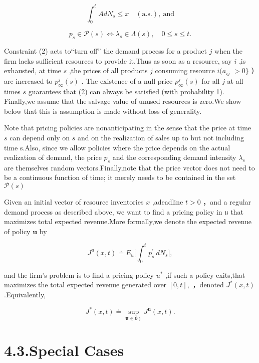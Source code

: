 \[
\int _ { 0 } ^ { t } A d N _ { s } \leqslant x \quad \mathrm { ( a . s . ) , ~ a n d }
\]

\[
p _ { s } \in \mathcal { P } ( s ) \Leftrightarrow \lambda _ { s } \in \Lambda ( s ) , \quad 0 \leqslant s \leqslant t .
\]

Constraint (2) acts to``turn off'' the demand process for a product
\(j\) when the firm lacks sufficient resources to provide it.Thus as
soon as a resource, say \(i\) ,is exhausted, at time \(s\) ,the prices
of all products \(j\) consuming resource \(i ( a _ { i j }\) \(> 0 \}\)
）are increased to \(p _ { \infty } ^ { j } ( s )\) . The existence of a
null price \(p _ { \infty } ^ { j } ( s )\) for all \(j\) at all times
\(s\) guarantees that (2) can always be satisfied (with probability 1).
Finally,we assume that the salvage value of unused resources is zero.We
show below that this is assumption is made without loss of generality.

Note that pricing policies are nonanticipating in the sense that the
price at time \(s\) can depend only on \(s\) and on the realization of
sales up to but not including time s.Also, since we allow policies where
the price depends on the actual realization of demand, the price
\(p _ { s }\) and the corresponding demand intensity \(\lambda _ { s }\)
are themselves random vectors.Finally,note that the price vector does
not need to be a continuous function of time; it merely needs to be
contained in the set \(\mathcal { P } ( s )\)

Given an initial vector of resource inventories \(x\) ,adeadline
\(t > 0\) ，and a regular demand process as described above, we want to
find a pricing policy in \(\mathfrak { u }\) that maximizes total
expected revenue.More formally,we denote the expected revenue of policy
\(\boldsymbol { u }\) by

\[
J ^ { u } ( x , t ) \doteq E _ { u } \biggl [ \int _ { 0 } ^ { t } p _ { s } ^ { \prime } \ d N _ { s } \biggl ] ,
\]

and the firm's problem is to find a pricing policy \(u ^ { * }\) ,if
such a policy exits,that maximizes the total expected revenue generated
over \([ 0 , t ] ,\) ，denoted \(J ^ { * } ( x , t )\) .Equivalently,

\[
J ^ { * } ( x , t ) \doteq \operatorname* { s u p } _ { \boldsymbol { \pi } \in \boldsymbol { 0 } \boldsymbol { \jmath } } J ^ { \boldsymbol { u } } ( x , t ) .
\]

\section{4.3.Special Cases}\label{special-cases}

